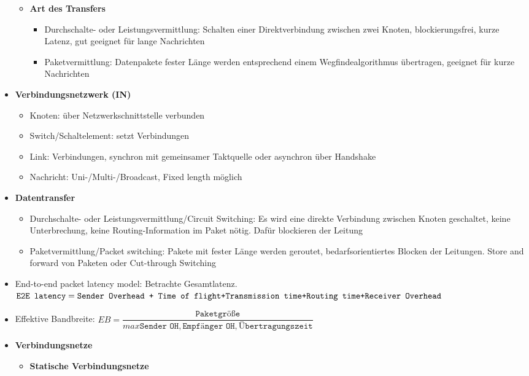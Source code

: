 \begin{itemize}
\begin{itemize}
			\item \textbf{Art des Transfers}
			\begin{itemize}
				\item Durchschalte- oder Leistungsvermittlung: Schalten einer Direktverbindung zwischen zwei Knoten, blockierungsfrei, kurze Latenz, gut geeignet für lange Nachrichten
				\item Paketvermittlung: Datenpakete fester Länge werden entsprechend einem Wegfindealgorithmus übertragen, geeignet für kurze Nachrichten
			\end{itemize}
		\end{itemize}
		\item \textbf{Verbindungsnetzwerk (IN)}
		\begin{itemize}
			\item Knoten: über Netzwerkschnittstelle verbunden
			\item Switch/Schaltelement: setzt Verbindungen
			\item Link: Verbindungen, synchron mit gemeinsamer Taktquelle oder asynchron über Handshake
			\item Nachricht: Uni-/Multi-/Broadcast, Fixed length möglich
		\end{itemize}
		\item \textbf{Datentransfer}
		\begin{itemize}
			\item Durchschalte- oder Leistungsvermittlung/Circuit Switching: Es wird eine direkte Verbindung zwischen Knoten geschaltet, keine Unterbrechung, keine Routing-Information im Paket nötig. Dafür blockieren der Leitung
			\item Paketvermittlung/Packet switching: Pakete mit fester Länge werden geroutet, bedarfsorientiertes Blocken der Leitungen. Store and forward von Paketen oder Cut-through Switching
		\end{itemize}
		\item End-to-end packet latency model: Betrachte Gesamtlatenz. $\texttt{E2E latency}=\texttt{Sender Overhead +  \texttt{Time of flight}+\texttt{Transmission time}+\texttt{Routing time}+\texttt{Receiver Overhead}}$
		\item Effektive Bandbreite: $EB=\dfrac{\texttt{Paketgröße}}{max{\texttt{Sender OH}, \texttt{Empfänger OH}, \texttt{Übertragungszeit}}}$
		\item \textbf{Verbindungsnetze}
		\begin{itemize}
			\item \textbf{Statische Verbindungsnetze}
			\begin{itemize}

\end{itemize}
\end{itemize}
\end{itemize}
